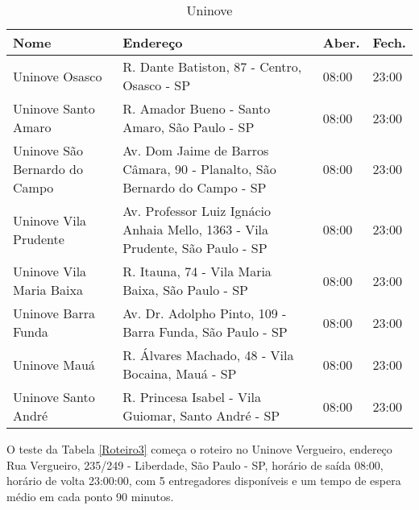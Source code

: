 \begin{table}[h]
	\centering
	\caption{Uninove}
	\label{Roteiro4}
	\begin{tabular}{C{3cm}C{8cm}C{2cm}C{2cm}}
		\toprule
		Nome                     & Endereço                                                         & Aber. & Fech. \\ \midrule
		Uninove Osasco                & R. Dante Batiston, 87 - Centro, Osasco - SP                                   & 08:00    & 23:00      \\
		Uninove Santo Amaro           & R. Amador Bueno - Santo Amaro, São Paulo - SP                                 & 08:00    & 23:00      \\
		Uninove São Bernardo do Campo & Av. Dom Jaime de Barros Câmara, 90 - Planalto, São Bernardo do Campo - SP     & 08:00    & 23:00      \\
		Uninove Vila Prudente         & Av. Professor Luiz Ignácio Anhaia Mello, 1363 - Vila Prudente, São Paulo - SP & 08:00    & 23:00      \\
		Uninove Vila Maria Baixa      & R. Itauna, 74 - Vila Maria Baixa, São Paulo - SP                              & 08:00    & 23:00      \\
		Uninove Barra Funda           & Av. Dr. Adolpho Pinto, 109 - Barra Funda, São Paulo - SP                      & 08:00    & 23:00      \\
		Uninove Mauá                  & R. Álvares Machado, 48 - Vila Bocaina, Mauá - SP                              & 08:00    & 23:00      \\
		Uninove Santo André           & R. Princesa Isabel - Vila Guiomar, Santo André - SP                           & 08:00    & 23:00 \\ \bottomrule
	\end{tabular}
\end{table}

O teste da Tabela \ref{Roteiro3} começa o roteiro no Uninove Vergueiro, endereço Rua Vergueiro, 235/249 - Liberdade, São Paulo - SP, horário de saída 08:00, horário de volta 23:00:00, com 5 entregadores disponíveis e um tempo de espera médio em cada ponto 90 minutos.

